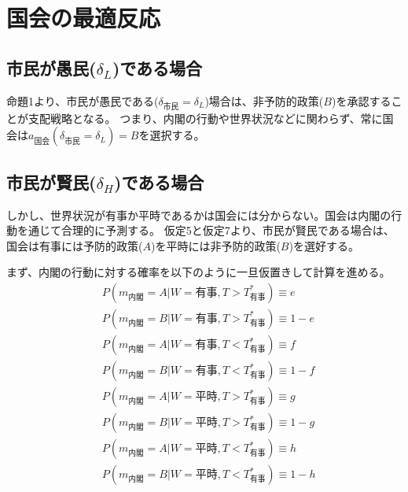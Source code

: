 \documentclass[main.tex]{subfiles}
\begin{document}
\section{国会の最適反応}


\subsection{市民が愚民($\delta_L$)である場合}

命題1より、市民が愚民である($\delta_{市民} = \delta_L$)場合は、非予防的政策($B$)を承認することが支配戦略となる。
つまり、内閣の行動や世界状況などに関わらず、常に国会は$a_{国会}(\delta_{市民}=\delta_L)=B$を選択する。



\subsection{市民が賢民($\delta_H$)である場合}

しかし、世界状況が有事か平時であるかは国会には分からない。国会は内閣の行動を通じて合理的に予測する。
仮定5と仮定7より、市民が賢民である場合は、国会は有事には予防的政策($A$)を平時には非予防的政策($B$)を選好する。

まず、内閣の行動に対する確率を以下のように一旦仮置きして計算を進める。
\begin{align*}
    & P(m_{内閣} = A| W = {有事}, T > T^*_{有事}) \equiv e \\
    & P(m_{内閣} = B| W = {有事}, T > T^*_{有事} ) \equiv 1-e \\
    & P(m_{内閣} = A| W = {有事}, T < T^*_{有事}) \equiv f \\
    & P(m_{内閣} = B| W = {有事}, T < T^*_{有事} ) \equiv 1-f \\
    & P(m_{内閣} = A| W = {平時}, T > T^*_{有事}) \equiv g \\
    & P(m_{内閣} = B| W = {平時}, T > T^*_{有事} ) \equiv 1-g \\
    & P(m_{内閣} = A| W = {平時}, T < T^*_{有事}) \equiv h \\
    & P(m_{内閣} = B| W = {平時}, T < T^*_{有事} ) \equiv 1-h
\end{align*}
\end{document}
